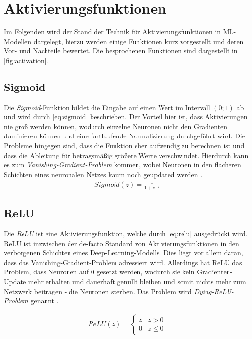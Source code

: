 \section{Aktivierungsfunktionen} \label{sec:activation}

Im Folgenden wird der Stand der Technik für Aktivierungsfunktionen in \ac{ML}-Modellen dargelegt,
hierzu werden einige Funktionen kurz vorgestellt und deren Vor- und Nachteile bewertet. 
Die besprochenen Funktionen sind dargestellt in \autoref{fig:activation}.

\subsection{Sigmoid}

Die \textit{Sigmoid}-Funktion bildet die Eingabe auf einen Wert im Intervall $(0;1)$ ab und wird durch \autoref{eq:sigmoid} beschrieben.
Der Vorteil hier ist, dass Aktivierungen nie groß werden können, wodurch einzelne Neuronen nicht den Gradienten dominieren können und 
eine fortlaufende Normalisierung durchgeführt wird. Die Probleme hingegen sind, dass die Funktion eher aufwendig zu berechnen ist 
und dass die Ableitung für betragsmäßig größere Werte verschwindet. Hierdurch kann es zum \textit{Vanishing-Gradient-Problem} kommen, wobei 
Neuronen in den flacheren Schichten eines neuronalen Netzes kaum noch geupdated werden \cite[S.~191--192]{Goodfellow.2016}. 
\begin{align}
	\label{eq:sigmoid} Sigmoid(z) = \frac{1}{1+e^{-z}}
\end{align} 

\subsection{\acf{ReLU}}

Die \textit{\acf{ReLU}} ist eine Aktivierungsfunktion, welche durch \autoref{eq:relu} ausgedrückt wird. 
\ac{ReLU} ist inzwischen der de-facto Standard von Aktivierungsfunktionen in den verborgenen Schichten eines Deep-Learning-Modells.
Dies liegt vor allem daran, dass das Vanishing-Gradient-Problem adressiert wird. Allerdings hat \ac{ReLU} das Problem, 
dass Neuronen auf $0$ gesetzt werden, wodurch sie kein Gradienten-Update mehr erhalten und dauerhaft genullt bleiben 
und somit nichts mehr zum Netzwerk beitragen - die Neuronen sterben. Das Problem wird \textit{Dying-\ac{ReLU}-Problem} genannt \cite[S.~189--191]{Goodfellow.2016}. 

\begin{align}
	\label{eq:relu} ReLU(z) = \begin{cases} 
		z & z > 0 \\
		0 & z \leq 0 
	\end{cases}
\end{align} 

